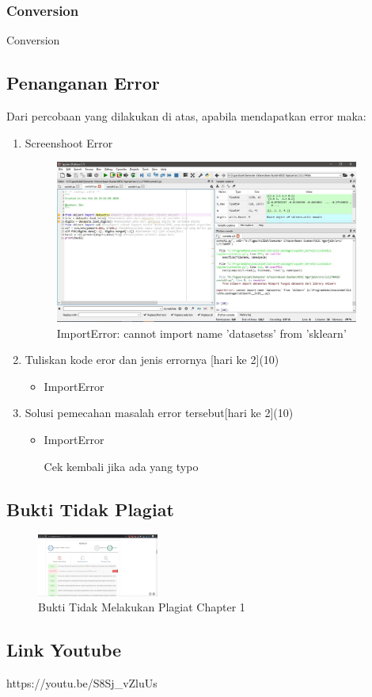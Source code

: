 \subsubsection{Conversion}
Conversion


\subsection{Penanganan Error}

Dari percobaan yang dilakukan di atas, apabila mendapatkan error maka:
\begin{enumerate}

\item Screenshoot Error
\begin{figure}[H]
	\begin{center}
   	 \includegraphics[width=10cm]{figures/1174066/1/error1.png}
   	 \caption{ImportError: cannot import name 'datasetss' from 'sklearn'}	
	\end{center}
\end{figure}
	
\item Tuliskan kode eror dan jenis errornya [hari ke 2](10)
\begin{itemize}
\item ImportError
\end{itemize}

\item Solusi pemecahan masalah error tersebut[hari ke 2](10)
\begin{itemize}
\item ImportError

Cek kembali jika ada yang typo
\end{itemize}

\end{enumerate}

\subsection{Bukti Tidak Plagiat}
\begin{figure}[H]
	\includegraphics[width=4cm]{figures/1174066/1/plagiat.png}
	\centering
	\caption{Bukti Tidak Melakukan Plagiat Chapter 1}
\end{figure}

\subsection{Link Youtube}
https://youtu.be/S8Sj\_vZluUs